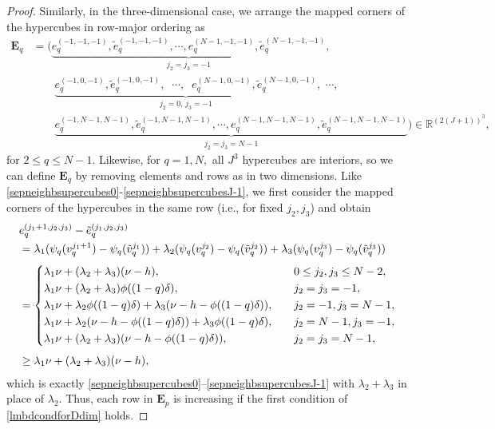 \documentclass[10pt,reqno,final]{amsart}
\theoremstyle{remark}
\theoremstyle{definition}
\newcommand{\bs}[1]{\boldsymbol{#1}}
\begin{document}
\begin{proof}
Similarly, in the three-dimensional case, we arrange the mapped corners of the hypercubes in row-major ordering as 
\begin{equation*}\label{ufform3D}
\begin{split}
{\bs E_q} &=\big(\underbrace{ e_q^{(-1,-1,-1)},\tilde e_q^{(-1,-1,-1)},\cdots,  e_q^{(N-1,-1,-1)},\tilde e_q^{(N-1,-1,-1)}}_{j_2=j_3=-1}, \\[6pt]& \qquad  \underbrace{e_q^{(-1,0,-1)},\tilde e_q^{(-1,0,-1)},\;\; \cdots,\;\;  e_q^{(N-1,0,-1)},\tilde e_q^{(N-1,0,-1)}}_{j_2=0,\, j_3=-1},\; \cdots,\; \\[6pt]&
\qquad 
 \underbrace{ e_q^{(-1,N-1,N-1)},\tilde e_q^{(-1,N-1,N-1)},\cdots,  e_q^{(N-1,N-1,N-1)},\tilde e_q^{(N-1,N-1,N-1)}}_{j_2=j_3=N-1}\big)\in {\mathbb R}^{(2(J+1))^3},
\end{split}
\end{equation*}
for $2\le q\le N-1.$ Likewise, for $q=1,N,$ all $J^3$ hypercubes are interiors, so we can define ${\bs E_q}$ by removing elements and rows as in two dimensions. 
Like \eqref{sepneighbsupercubes0}-\eqref{sepneighbsupercubesJ-1}, we first consider  
the mapped corners of the hypercubes in the same row (i.e.,  for fixed $j_2, j_3$) and  obtain 
\begin{equation}\label{3Dsepneighbsupercubes0}
\begin{split}
& e_q^{(j_1+1,j_2,j_3)}-\tilde e_q^{(j_1,j_2,j_3)}\\& =
\lambda_1(\psi_q( v_q^{j_1+1})-\psi_q(\tilde v_q^{j_1}))
+\lambda_2(\psi_q( v_q^{j_2})-\psi_q(\tilde v_q^{j_2}))+\lambda_3(\psi_q( v_q^{j_3})-\psi_q(\tilde v_q^{j_3}))
\\[4pt]&=
\begin{dcases}
\lambda_1\nu +(\lambda_2+\lambda_3) (\nu-h), & 0\leq j_2,j_3\leq N-2,\\
\lambda_1\nu +(\lambda_2+\lambda_3)\phi((1-q)\delta),& j_2=j_3=-1,\\
\lambda_1\nu +\lambda_2\phi((1-q)\delta)+\lambda_3(\nu-h-\phi((1-q)\delta)),\quad & j_2=-1,j_3=N-1,\\
\lambda_1\nu +\lambda_2(\nu-h-\phi((1-q)\delta))+\lambda_3\phi((1-q)\delta),& j_2=N-1,j_3=-1,\\
\lambda_1\nu +(\lambda_2+\lambda_3) (\nu-h-\phi((1-q)\delta)),& j_2=j_3=N-1,
\end{dcases}\\[4pt]
&\geq \lambda_1\nu +(\lambda_2+\lambda_3) (\nu-h),
\end{split}
\end{equation}
which is exactly \eqref{sepneighbsupercubes0}–\eqref{sepneighbsupercubesJ-1} with $\lambda_2+\lambda_3$ in place of $\lambda_2$.  Thus, each row in $\bs E_p$ is increasing if the first condition of \eqref{lmbdcondforDdim} holds.


\end{proof}
\end{document}
